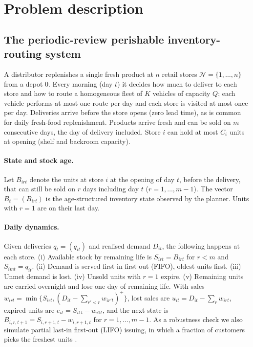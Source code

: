 \section{Problem description}\label{sec:problem}

\subsection{The periodic-review perishable inventory-routing system}\label{sec:system}

A distributor replenishes a single fresh product at $n$ retail stores $\mathcal{N}=\{1,\dots,n\}$ from a depot $0$. Every morning (day $t$) it decides how much to deliver to each store and how to route a homogeneous fleet of $K$ vehicles of capacity $Q$; each vehicle performs at most one route per day and each store is visited at most once per day. Deliveries arrive before the store opens (zero lead time), as is common for daily fresh-food replenishment. Products arrive fresh and can be sold on $m$ consecutive days, the day of delivery included. Store $i$ can hold at most $C_i$ units at opening (shelf and backroom capacity).

\paragraph{State and stock age.} Let $B_{irt}$ denote the units at store $i$ at the opening of day $t$, before the delivery, that can still be sold on $r$ days including day $t$ ($r=1,\dots,m-1$). The vector $B_t=(B_{irt})$ is the age-structured inventory state observed by the planner. Units with $r=1$ are on their last day.

\paragraph{Daily dynamics.} Given deliveries $q_t=(q_{it})$ and realised demand $D_{it}$, the following happens at each store. (i) Available stock by remaining life is $S_{irt}=B_{irt}$ for $r<m$ and $S_{imt}=q_{it}$. (ii) Demand is served first-in first-out (FIFO), oldest units first. (iii) Unmet demand is lost. (iv) Unsold units with $r=1$ expire. (v) Remaining units are carried overnight and lose one day of remaining life. With sales $w_{irt}=\min\{S_{irt},(D_{it}-\sum_{r'<r}w_{ir't})^{+}\}$, lost sales are $u_{it}=D_{it}-\sum_r w_{irt}$, expired units are $e_{it}=S_{i1t}-w_{i1t}$, and the next state is $B_{i,r,t+1}=S_{i,r+1,t}-w_{i,r+1,t}$ for $r=1,\dots,m-1$. As a robustness check we also simulate partial last-in first-out (LIFO) issuing, in which a fraction of customers picks the freshest units \citep{haijema2014new}.

